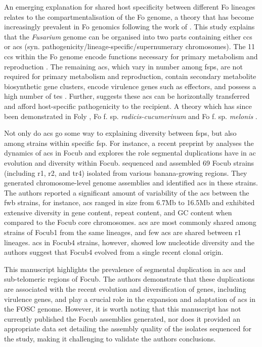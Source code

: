 An emerging explanation for shared host specificity between different \ac{Fo} lineages relates to the compartmentalisation of the \acl{Fo} genome, a theory that has become increasingly prevalent in \ac{Fo} genomics following the work of \textcite{Ma2010}. This study explains that the \textit{Fusarium} genome can be organised into two parts containing either \acp{cc} or \acp{ac} (syn. pathogenicity/lineage-specific/supernumerary chromosomes). The 11 \acp{cc} within the \ac{Fo} genome encode functions necessary for primary metabolism and reproduction \parencite{Dam2017}. The remaining \acp{ac}, which vary in number among \acp{fsp}, are not required for primary metabolism and reproduction, contain secondary metabolite biosynthetic gene clusters, encode virulence genes such as effectors, and possess a high number of \acp{te} \parencite{Ma2010, Schmidt2013, Witte2021}. Further, \textcite{Ma2010} suggests these \acp{ac} can be horizontally transferred and afford host-specific pathogenicity to the recipient. A theory which has since been demonstrated in \ac{Foly} \parencite{Vlaardingerbroek2016, Li2020}, \ac{Fo} f. sp. \textit{radicis-cucumerinum} \parencite{Dam2017} and \ac{Fo} f. sp.  \textit{melonis} \parencite{Li2020}. 
 
Not only do \acp{ac} go some way to explaining diversity between \acp{fsp}, but also among strains within specific \ac{fsp}. For instance, a recent preprint by \textcite{Westerhoven2023} analyses the dynamics of \acp{ac} in \ac{Focub} and explores the role segmental duplications have in \ac{ac} evolution and diversity within \ac{Focub}. \textcite{Westerhoven2023} sequenced and assembled 69 \ac{Focub} strains (including \ac{r1}, \ac{r2}, and \ac{tr4})  isolated from various banana-growing regions. They generated chromosome-level genome assemblies and identified \acp{ac} in these strains.  The authors reported a significant amount of variability of the \acp{ac} between the \ac{fwb} strains, for instance, \acp{ac} ranged in size from 6.7Mb to 16.5Mb and exhibited extensive diversity in gene content, repeat content, and GC content when compared to the \ac{Focub} core chromosomes. \Acp{ac} are most commonly shared among strains of \ac{Focub1} from the same lineages, and few \acp{ac} are shared between \ac{r1} lineages. \Acp{ac} in \ac{Focub4} strains, however, showed low nucleotide diversity and the authors suggest that \ac{Focub4} evolved from a single recent clonal origin. 

This manuscript highlights the prevalence of segmental duplication in \acp{ac} and sub-telomeric regions of \ac{Focub}. The authors demonstrate that these duplications are associated with the recent evolution and diversification of genes, including virulence genes, and play a crucial role in the expansion and adaptation of \acp{ac} in the \ac{FOSC} genome. However, it is worth noting that this manuscript has not currently published the \ac{Focub} assemblies generated, nor does it provided an appropriate data set detailing the assembly quality of the isolates sequenced for the study, making it challenging to validate the authors conclusions. 

